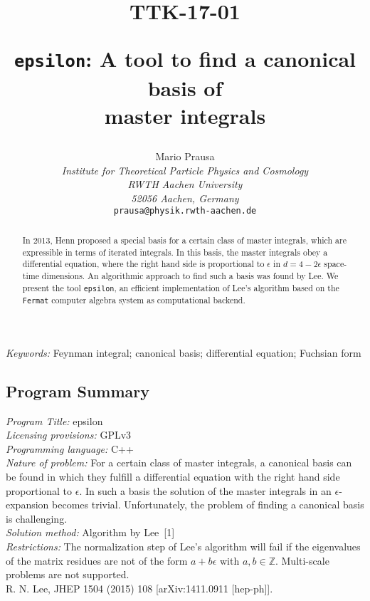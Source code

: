 \documentclass[12pt]{article}
\title{\vskip-3cm{\baselineskip14pt
  \begin{flushleft}
      \normalsize TTK-17-01
  \end{flushleft}}
  \vskip1.5cm
	{\tt epsilon}: A tool to find a canonical basis of\\ master integrals
}
\author{\small
  Mario Prausa
  \\[1em]
  {\small \it Institute for Theoretical Particle Physics and Cosmology}\\
  {\small \it RWTH Aachen University}\\
  {\small \it 52056 Aachen, Germany}\\[.5em]
  {\small \tt prausa@physik.rwth-aachen.de}
}
\date{}
\numberwithin{equation}{section}
\numberwithin{figure}{section}
\begin{document}
  \maketitle
  \begin{abstract}
    In 2013, Henn proposed a special basis for a certain class of master integrals, which are expressible in terms of iterated integrals.
    In this basis, the master integrals obey a differential equation, where the right hand side is proportional to $\epsilon$ in $d=4-2\epsilon$ space-time dimensions.
    An algorithmic approach to find such a basis was found by Lee.
    We present the tool \texttt{epsilon}, an efficient implementation of Lee's algorithm based on the \texttt{Fermat} computer algebra system as computational backend.
  \end{abstract}

  {\em Keywords:} Feynman integral; canonical basis; differential equation; Fuchsian form 

  \subsection*{Program Summary}
		\begin{small}
			{\em Program Title:} epsilon \\
			{\em Licensing provisions:} GPLv3 \\
			{\em Programming language:} C++ \\
			{\em Nature of problem:} 
        For a certain class of master integrals, a canonical basis can be found in which they fulfill a differential equation with the right hand side proportional to $\epsilon$.
        In such a basis the solution of the master integrals in an $\epsilon$-expansion becomes trivial.
				Unfortunately, the problem of finding a canonical basis is challenging.
				\\
			{\em Solution method:} Algorithm by Lee~[1] \\
			{\em Restrictions:} 
				The normalization step of Lee's algorithm will fail if the eigenvalues of the matrix residues are not of the form $a+b\epsilon$ with $a,b \in\mathds{Z}$.
				Multi-scale problems are not supported.
        \\[8pt]
        \;[1] R. N. Lee, JHEP 1504 (2015) 108 [arXiv:1411.0911 [hep-ph]].
		\end{small}
\end{document}
